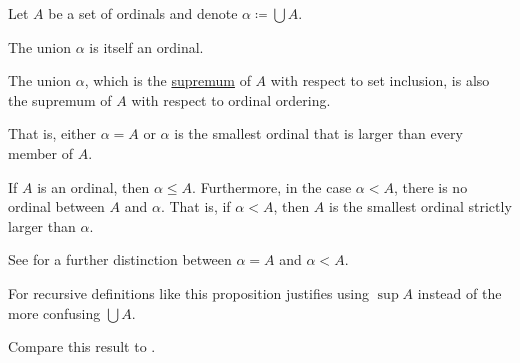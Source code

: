 \begin{proposition}\label{thm:union_of_set_of_ordinals}
  Let \( A \) be a set of ordinals and denote \( \alpha \coloneqq \bigcup A \).

  \begin{thmenum}
     The union \( \alpha \) is itself an ordinal.

     The union \( \alpha \), which is the \hyperref[def:partially_ordered_set_extremal_points/supremum_and_infimum]{supremum} of \( A \) with respect to set inclusion, is also the supremum of \( A \) with respect to ordinal ordering.

    That is, either \( \alpha = A \) or \( \alpha \) is the smallest ordinal that is larger than every member of \( A \).

     If \( A \) is an ordinal, then \( \alpha \leq A \). Furthermore, in the case \( \alpha < A \), there is no ordinal between \( A \) and \( \alpha \). That is, if \( \alpha < A \), then \( A \) is the smallest ordinal strictly larger than \( \alpha \).

    See  for a further distinction between \( \alpha = A \) and \( \alpha < A \).
  \end{thmenum}

  For recursive definitions like  this proposition justifies using \( \sup A \) instead of the more confusing \( \bigcup A \).

  Compare this result to .
\end{proposition}
